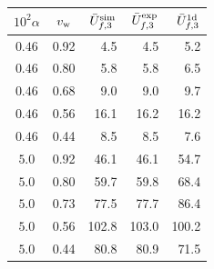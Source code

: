 \begin{tabular}{cc | rrr }
\hline\hline
$10^2\alpha$ & $v_{\rm w}$ & $\bar{U}_{f,3}^{\rm sim}$ & $\bar{U}_{f,3}^{\rm exp}$ & $\bar{U}_{f,3}^{\rm 1d}$ \\
\hline
$ 0.46 $ & 0.92 &  4.5 &  4.5 &  5.2 \\
$ 0.46 $ & 0.80 &  5.8 &  5.8 &  6.5 \\
$ 0.46 $ & 0.68 &  9.0 &  9.0 &  9.7 \\
$ 0.46 $ & 0.56 & 16.1 & 16.2 & 16.2 \\
$ 0.46 $ & 0.44 &  8.5 &  8.5 &  7.6 \\
$ 5.0 $ & 0.92 & 46.1 & 46.1 & 54.7 \\
$ 5.0 $ & 0.80 & 59.7 & 59.8 & 68.4 \\
$ 5.0 $ & 0.73 & 77.5 & 77.7 & 86.4 \\
$ 5.0 $ & 0.56 & 102.8 & 103.0 & 100.2 \\
$ 5.0 $ & 0.44 & 80.8 & 80.9 & 71.5 \\
\hline\hline
\end{tabular}
